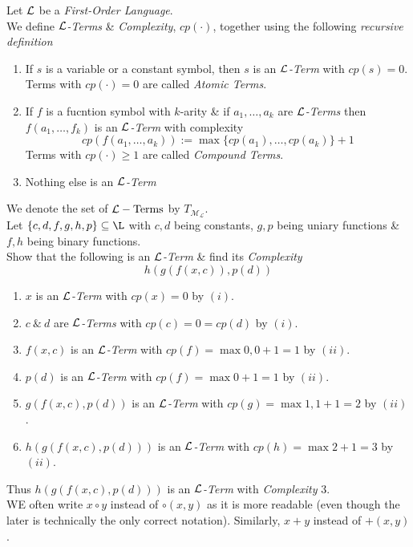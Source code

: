\documentclass[11pt,a4paper]{article}
\begin{document}
Let $\mathcal{L}$ be a \textit{First-Order Language}.\\
We define \textit{$\mathcal{L}$-Terms} \& \textit{Complexity}, $cp(\cdot)$, together using the following \textit{recursive definition}
\begin{enumerate}
	\item If $s$ is a variable or a constant symbol, then $s$ is an \textit{$\mathcal{L}$-Term} with $cp(s)=0$.\\
	\nb Terms with $cp(\cdot)=0$ are called \textit{Atomic Terms}.
	\item If $f$ is a fucntion symbol with $k$-arity \& if $a_1,\dots,a_k$ are \textit{$\mathcal{L}$-Terms} then $f(a_1,\dots,f_k)$ is an \textit{$\mathcal{L}$-Term} with complexity
	$$cp(f(a_1,\dots,a_k)):=\max\{cp(a_1),\dots,cp(a_k)\}+1$$
	\nb Terms with $cp(\cdot)\geq1$ are called \textit{Compound Terms}.
	\item Nothing else is an \textit{$\mathcal{L}$-Term}
\end{enumerate}
\nb We denote the set of $\mathcal{L}-\text{Terms}$ by $T_\mathcal{M_L}$.\\

Let $\{c,d,f,g,h,p\}\subseteq\L$ with $c,d$ being constants, $g,p$ being uniary functions \& $f,h$ being binary functions.\\
Show that the following is an $\mathcal{L}$\textit{-Term} \& find its \textit{Complexity}
$$h(g(f(x,c)),p(d))$$
\begin{enumerate}
	\item $x$ is an $\mathcal{L}$\textit{-Term} with $cp(x)=0$ by $(i)$.
	\item $c\ \&\ d$ are $\mathcal{L}$\textit{-Terms} with $cp(c)=0=cp(d)$ by $(i)$.
	\item $f(x,c)$ is an $\mathcal{L}$\textit{-Term} with $cp(f)=\max{0,0}+1=1$ by $(ii)$.
	\item $p(d)$ is an $\mathcal{L}$\textit{-Term} with $cp(f)=\max{0}+1=1$ by $(ii)$.
	\item $g(f(x,c),p(d))$ is an $\mathcal{L}$\textit{-Term} with $cp(g)=\max{1,1}+1=2$ by $(ii)$.
	\item $h(g(f(x,c),p(d)))$ is an $\mathcal{L}$\textit{-Term} with $cp(h)=\max{2}+1=3$ by $(ii)$.
\end{enumerate}
Thus $h(g(f(x,c),p(d)))$ is an $\mathcal{L}$\textit{-Term} with \textit{Complexity} 3.\\

WE often write $x\circ y$ instead of $\circ(x,y)$ as it is more readable (even though the later is technically the only correct notation). Similarly, $x+y$ instead of $+(x,y)$.\\
\end{document}
